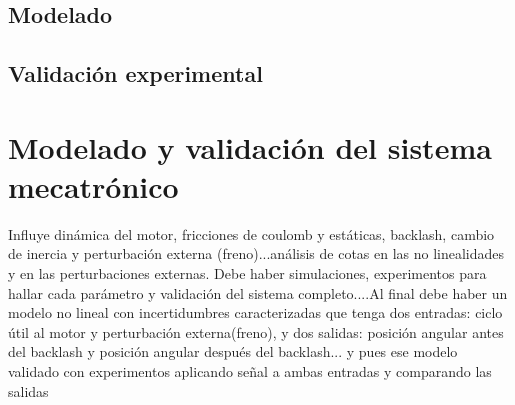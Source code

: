 \subsection{Modelado}


\subsection{Validaci\'on experimental}


\section{Modelado y validaci\'on del sistema mecatr\'onico}
Influye din\'amica del motor, fricciones de coulomb y est\'aticas, backlash, cambio de inercia y perturbaci\'on externa (freno)...an\'alisis de cotas en las no linealidades y en las perturbaciones externas. Debe haber simulaciones, experimentos para hallar cada par\'ametro y validaci\'on del sistema completo....Al final debe haber un modelo no lineal con incertidumbres caracterizadas que tenga dos entradas: ciclo \'util al motor y perturbaci\'on externa(freno), y dos salidas: posici\'on angular antes del backlash y posici\'on angular despu\'es del backlash... y pues ese modelo validado con experimentos aplicando se\~nal a ambas entradas y comparando las salidas